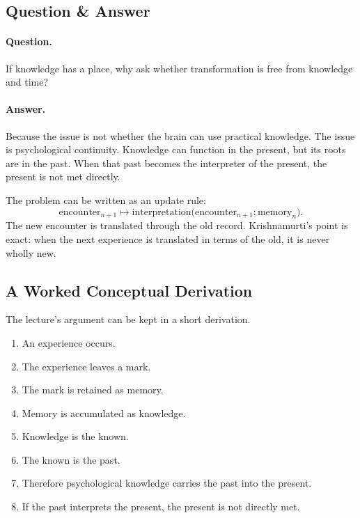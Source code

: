 \subsection{Question \& Answer}

\paragraph{Question.}
If knowledge has a place, why ask whether transformation is free from knowledge and time?

\paragraph{Answer.}
Because the issue is not whether the brain can use practical knowledge. The issue is psychological continuity. Knowledge can function in the present, but its roots are in the past. When that past becomes the interpreter of the present, the present is not met directly.

The problem can be written as an update rule:
\begin{equation}
\mathrm{encounter}_{n+1}
\longmapsto
\mathrm{interpretation}\bigl(\mathrm{encounter}_{n+1};\mathrm{memory}_{n}\bigr).
\end{equation}
The new encounter is translated through the old record. Krishnamurti's point is exact: when the next experience is translated in terms of the old, it is never wholly new.

\subsection{A Worked Conceptual Derivation}

The lecture's argument can be kept in a short derivation.

\begin{enumerate}
\item An experience occurs.
\item The experience leaves a mark.
\item The mark is retained as memory.
\item Memory is accumulated as knowledge.
\item Knowledge is the known.
\item The known is the past.
\item Therefore psychological knowledge carries the past into the present.
\item If the past interprets the present, the present is not directly met.
\end{enumerate}

